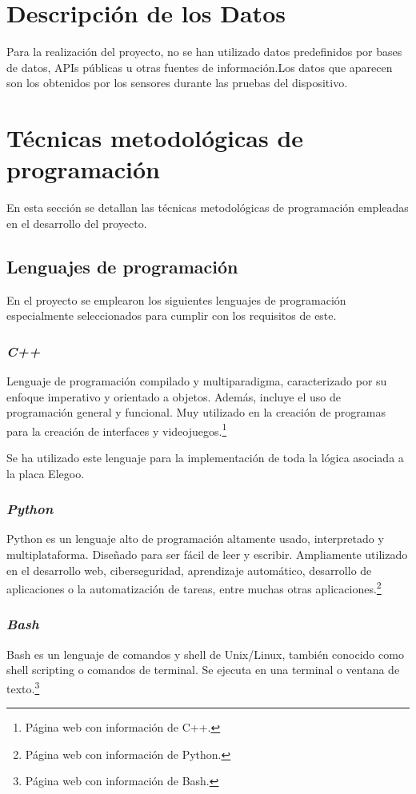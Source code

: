 
\section{Descripción de los Datos}
Para la realización del proyecto, no se han utilizado datos predefinidos por bases de datos, APIs públicas u otras fuentes de información.Los datos que aparecen son los obtenidos por los sensores durante las pruebas del dispositivo.
\section{Técnicas metodológicas de programación}
En esta sección se detallan las técnicas metodológicas de programación empleadas en el desarrollo del proyecto. 
\subsection{Lenguajes de programación}
En el proyecto se emplearon los siguientes lenguajes de programación especialmente seleccionados para cumplir con los requisitos de este.
\subsubsection{\textit{C++}}
Lenguaje de programación compilado y multiparadigma, caracterizado por su enfoque imperativo y orientado a objetos. Además, incluye el uso de programación general y funcional.
Muy utilizado en la creación de programas para la creación de interfaces y videojuegos.\cite{C++}\footnote{Página web con información de C++\cite{C++}.}

Se ha utilizado este lenguaje para la implementación de toda la lógica asociada a la placa Elegoo.
\subsubsection{\textit{Python}}
Python es un lenguaje alto de programación altamente usado, interpretado y multiplataforma. Diseñado para ser fácil de leer y escribir.
Ampliamente utilizado en el desarrollo web, ciberseguridad, aprendizaje automático, desarrollo de aplicaciones o la automatización de tareas, entre muchas otras aplicaciones.\cite{Python}\footnote{Página web con información de Python\cite{Python}.}
\subsubsection{\textit{Bash}}
Bash es un lenguaje de comandos y shell de Unix/Linux, también conocido como shell scripting o comandos de terminal.
Se ejecuta en una terminal o ventana de texto.\cite{Bash}\footnote{Página web con información de Bash\cite{Bash}.}

